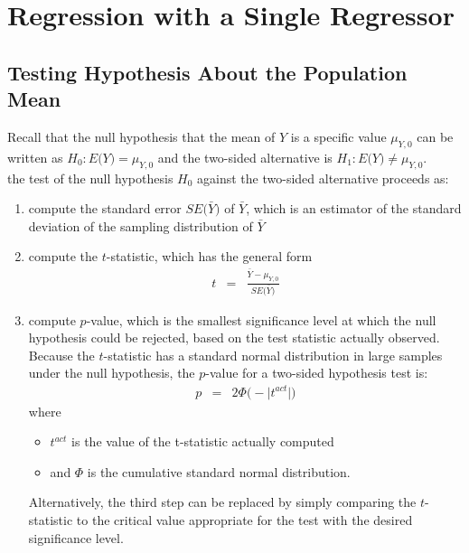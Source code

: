 \chapter{Regression with a Single Regressor}

\section{Testing Hypothesis About the Population Mean}
Recall that the null hypothesis that the mean of $Y$ is a specific value $\mu_{Y, 0}$ can be written as $H_{0}: E\big(Y\big) = \mu_{Y, 0}$ and the two-sided alternative is $H_{1}: E\big(Y\big) \neq \mu_{Y, 0}$.\\
the test of the null hypothesis $H_{0}$ against the two-sided alternative proceeds as:
\begin{enumerate}
	\item compute the standard error $SE\big(\bar{Y}\big)$ of $\bar{Y}$, which is an estimator of the standard deviation of the sampling distribution of $\bar{Y}$
	\item compute the $t$-statistic, which has the general form
	\begin{eqnarray}
		t &=& \frac{\bar{Y} - \mu_{Y, 0}}{SE\big(\bar{Y}\big)}
	\end{eqnarray}
	\item compute $p$-value, which is the smallest significance level at which the null hypothesis could be rejected, based on the test statistic actually observed.\\
	Because the $t$-statistic has a standard normal distribution in large samples under the null hypothesis, the $p$-value for a two-sided hypothesis test is:
	\begin{eqnarray}
		p &=& 2\Phi\big(-\bigr\rvert t^{act} \bigr\rvert\big)
	\end{eqnarray}
	where
	\begin{itemize}
		\item $t^{act}$ is the value of the t-statistic actually computed
		\item and $\Phi$ is the cumulative standard normal distribution.
	\end{itemize}
	Alternatively, the third step can be replaced by simply comparing the $t$-statistic to the critical value appropriate for the test with the desired significance level.
\end{enumerate}



